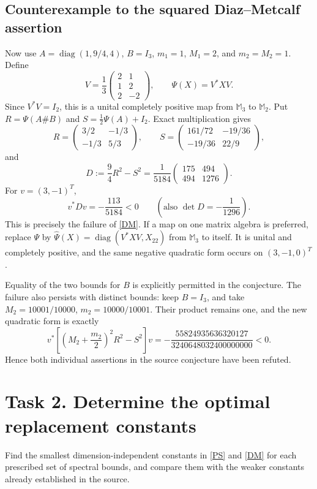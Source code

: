 \documentclass[11pt]{article}
\begin{document}
\subsection*{Counterexample to the squared Diaz--Metcalf assertion}
Now use $A=\operatorname{diag}(1,9/4,4)$, $B=I_3$,
$m_1=1$, $M_1=2$, and $m_2=M_2=1$. Define
\[
 V=\frac13\begin{pmatrix}2&1\\1&2\\2&-2\end{pmatrix},\qquad
 \Psi(X)=V^*XV.
\]
Since $V^*V=I_2$, this is a unital completely positive map from
$\mathbb M_3$ to $\mathbb M_2$. Put $R=\Psi(A\#B)$ and
$S=\frac12\Psi(A)+I_2$. Exact multiplication gives
\[
 R=\begin{pmatrix}3/2&-1/3\\-1/3&5/3\end{pmatrix},\qquad
 S=\begin{pmatrix}161/72&-19/36\\-19/36&22/9\end{pmatrix},
\]
and
\[
 D:=\frac94R^2-S^2
 =\frac1{5184}\begin{pmatrix}175&494\\494&1276\end{pmatrix}.
\]
For $v=(3,-1)^T$,
\[
 v^*Dv=-\frac{113}{5184}<0
 \qquad\left(\text{also }\det D=-\frac1{1296}\right).
\]
This is precisely the failure of \eqref{DM}. If a map on one matrix algebra
is preferred, replace $\Psi$ by
$\widehat\Psi(X)=\operatorname{diag}(V^*XV,X_{22})$ from
$\mathbb M_3$ to itself. It is unital and completely positive, and the same
negative quadratic form occurs on $(3,-1,0)^T$.

Equality of the two bounds for $B$ is explicitly permitted in the conjecture.
The failure also persists with distinct bounds: keep $B=I_3$, and take
$M_2=10001/10000$, $m_2=10000/10001$. Their product remains one, and
the new quadratic form is exactly
\[
 v^*\left[\left(M_2+\frac{m_2}{2}\right)^2R^2-S^2\right]v
 =-\frac{55824935636320127}{3240648032400000000}<0.
\]
Hence both individual assertions in the source conjecture have been refuted.

\section*{Task 2. Determine the optimal replacement constants}
Find the smallest dimension-independent constants in \eqref{PS} and
\eqref{DM} for each prescribed set of spectral bounds, and compare them
with the weaker constants already established in the source.
\end{document}
